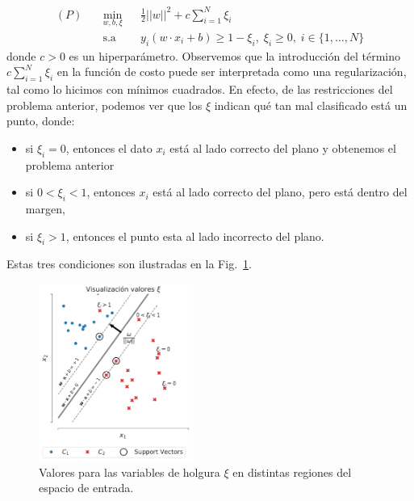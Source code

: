 \begin{equation}
\begin{aligned}
(P)\quad & \underset{w,b, \xi}{\text{min}}
& & \frac{1}{2}||w||^2 + c\sum\limits_{i=1}^{N} \xi_i \\
& \text{s.a}
& & y_i (w\cdot x_i +b) \geq 1 - \xi_i,\;\xi_i\geq0,\; i \in\{ 1, \ldots, N\}
\end{aligned}
\end{equation}
donde $c>0$ es un hiperparámetro. Observemos que la introducción del término $c\sum_{i=1}^{N} \xi_i$ en la función de costo puede ser interpretada como una regularización, tal como lo hicimos con mínimos cuadrados. En efecto, de las restricciones del problema anterior, podemos ver que los $\xi$ indican qué tan mal clasificado está un punto, donde: 
\begin{itemize}
    \item si $\xi_i = 0$, entonces el dato $x_i$ está al lado correcto del plano y obtenemos el problema anterior
    \item si $0<\xi_i <1$, entonces $x_i$ está al lado correcto del plano, pero está dentro del margen, 
    \item si $\xi_i>1$, entonces el punto esta al lado incorrecto del plano.
\end{itemize}
Estas tres condiciones son ilustradas en la Fig.~\ref{fig:soft_margin}.
\begin{figure}[ht]
    \centering
    \includegraphics[width=0.45\textwidth]{img/cap5_max_margen3}
    \caption{Valores para las variables de holgura $\xi$ en distintas regiones del espacio de entrada.}
    \label{fig:soft_margin}
\end{figure}

